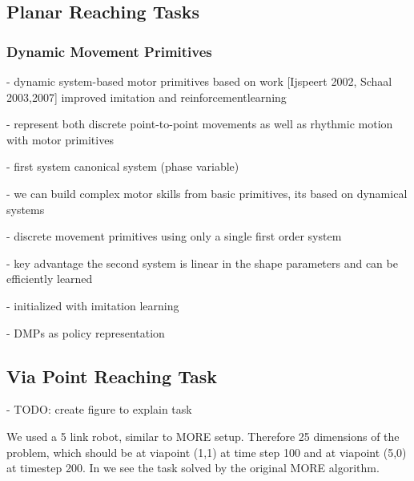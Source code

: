 
\subsection{Planar Reaching Tasks}

\subsubsection{Dynamic Movement Primitives}
- dynamic system-based motor primitives based on work [Ijspeert 2002, Schaal 2003,2007]
improved imitation and reinforcementlearning

- represent both discrete point-to-point movements as well as rhythmic motion
with motor primitives

- first system canonical system (phase variable)

- we can build complex motor skills from basic primitives,
  its based on dynamical systems

- discrete movement primitives using only a single first order system

- key advantage the second system is linear in the shape parameters and can
  be efficiently learned

- initialized with imitation learning

- DMPs as policy representation

\subsection{Via Point Reaching Task}
- TODO: create figure to explain task

We used a 5 link robot, similar to MORE setup.
Therefore 25 dimensions of the problem, which should be at viapoint (1,1)
at time step 100 and at viapoint (5,0) at timestep 200.
In  we see the task solved by the original MORE algorithm.


